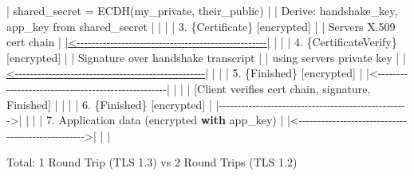 \documentclass[11pt]{article}
\newenvironment{Shaded}{\begin{snugshade}}{\end{snugshade}}
\newcommand{\ControlFlowTok}[1]{\textcolor[rgb]{0.99,0.74,0.29}{\textbf{#1}}}
\newcommand{\DecValTok}[1]{\textcolor[rgb]{0.96,0.45,0.00}{#1}}
\newcommand{\ErrorTok}[1]{\textcolor[rgb]{0.85,0.27,0.33}{\underline{#1}}}
\newcommand{\FloatTok}[1]{\textcolor[rgb]{0.96,0.45,0.00}{#1}}
\newcommand{\ImportTok}[1]{\textcolor[rgb]{0.15,0.68,0.38}{#1}}
\newcommand{\NormalTok}[1]{\textcolor[rgb]{0.81,0.81,0.76}{#1}}
\newcommand{\OperatorTok}[1]{\textcolor[rgb]{0.81,0.81,0.76}{#1}}
\newcommand{\StringTok}[1]{\textcolor[rgb]{0.96,0.31,0.31}{#1}}
\begin{document}
\begin{Shaded}
\begin{Highlighting}[]
  \OperatorTok{|}\NormalTok{ shared\_secret }\OperatorTok{=}\NormalTok{ ECDH(my\_private, their\_public)     }\OperatorTok{|}
  \OperatorTok{|}\NormalTok{ Derive: handshake\_key, app\_key }\ImportTok{from}\NormalTok{ shared\_secret  }\OperatorTok{|}
  \OperatorTok{|}                                                    \OperatorTok{|}
  \OperatorTok{|}              \FloatTok{3.}\NormalTok{ \{Certificate\} [encrypted]          }\OperatorTok{|}
  \OperatorTok{|}\NormalTok{                 Server}\StringTok{\textquotesingle{}s X.509 cert chain           |}
\ErrorTok{  |\textless{}{-}{-}{-}{-}{-}{-}{-}{-}{-}{-}{-}{-}{-}{-}{-}{-}{-}{-}{-}{-}{-}{-}{-}{-}{-}{-}{-}{-}{-}{-}{-}{-}{-}{-}{-}{-}{-}{-}{-}{-}{-}{-}{-}{-}{-}{-}{-}{-}{-}{-}{-}|}
  \OperatorTok{|}                                                    \OperatorTok{|}
  \OperatorTok{|}              \FloatTok{4.}\NormalTok{ \{CertificateVerify\} [encrypted]    }\OperatorTok{|}
  \OperatorTok{|}\NormalTok{                 Signature over handshake transcript }\OperatorTok{|}
  \OperatorTok{|}\NormalTok{                 using server}\StringTok{\textquotesingle{}s private key          |}
\ErrorTok{  |\textless{}{-}{-}{-}{-}{-}{-}{-}{-}{-}{-}{-}{-}{-}{-}{-}{-}{-}{-}{-}{-}{-}{-}{-}{-}{-}{-}{-}{-}{-}{-}{-}{-}{-}{-}{-}{-}{-}{-}{-}{-}{-}{-}{-}{-}{-}{-}{-}{-}{-}{-}{-}|}
  \OperatorTok{|}                                                    \OperatorTok{|}
  \OperatorTok{|}              \FloatTok{5.}\NormalTok{ \{Finished\} [encrypted]             }\OperatorTok{|}
  \OperatorTok{|\textless{}{-}{-}{-}{-}{-}{-}{-}{-}{-}{-}{-}{-}{-}{-}{-}{-}{-}{-}{-}{-}{-}{-}{-}{-}{-}{-}{-}{-}{-}{-}{-}{-}{-}{-}{-}{-}{-}{-}{-}{-}{-}{-}{-}{-}{-}{-}{-}{-}{-}{-}{-}|}
  \OperatorTok{|}                                                    \OperatorTok{|}
  \OperatorTok{|}\NormalTok{ [Client verifies cert chain, signature, Finished]  }\OperatorTok{|}
  \OperatorTok{|}                                                    \OperatorTok{|}
  \OperatorTok{|} \FloatTok{6.}\NormalTok{ \{Finished\} [encrypted]                          }\OperatorTok{|}
  \OperatorTok{|{-}{-}{-}{-}{-}{-}{-}{-}{-}{-}{-}{-}{-}{-}{-}{-}{-}{-}{-}{-}{-}{-}{-}{-}{-}{-}{-}{-}{-}{-}{-}{-}{-}{-}{-}{-}{-}{-}{-}{-}{-}{-}{-}{-}{-}{-}{-}{-}{-}{-}{-}\textgreater{}|}
  \OperatorTok{|}                                                    \OperatorTok{|}
  \OperatorTok{|} \FloatTok{7.}\NormalTok{ Application data (encrypted }\ControlFlowTok{with}\NormalTok{ app\_key)       }\OperatorTok{|}
  \OperatorTok{|\textless{}{-}{-}{-}{-}{-}{-}{-}{-}{-}{-}{-}{-}{-}{-}{-}{-}{-}{-}{-}{-}{-}{-}{-}{-}{-}{-}{-}{-}{-}{-}{-}{-}{-}{-}{-}{-}{-}{-}{-}{-}{-}{-}{-}{-}{-}{-}{-}{-}{-}{-}\textgreater{}|}
  \OperatorTok{|}                                                    \OperatorTok{|}

\NormalTok{Total: }\DecValTok{1}\NormalTok{ Round Trip (TLS }\FloatTok{1.3}\NormalTok{) vs }\DecValTok{2}\NormalTok{ Round Trips (TLS }\FloatTok{1.2}\NormalTok{)}
\end{Highlighting}
\end{Shaded}
\end{document}
